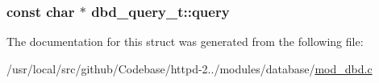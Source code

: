 \subsubsection[{\texorpdfstring{query}{query}}]{\setlength{\rightskip}{0pt plus 5cm}const char $\ast$ dbd\+\_\+query\+\_\+t\+::query}\hypertarget{structdbd__query__t_ab78402fbd13747096b8a758cbf63b232}{}\label{structdbd__query__t_ab78402fbd13747096b8a758cbf63b232}


The documentation for this struct was generated from the following file\+:\begin{DoxyCompactItemize}
\item 
/usr/local/src/github/\+Codebase/httpd-\/2../modules/database/\hyperlink{mod__dbd_8c}{mod\+\_\+dbd.\+c}\end{DoxyCompactItemize}
